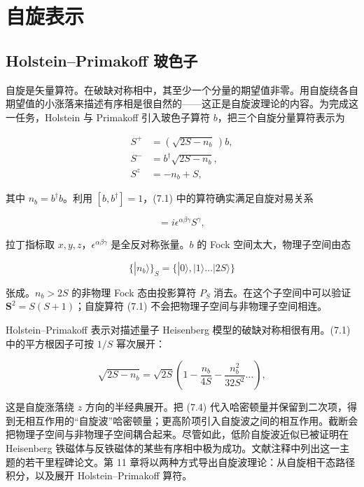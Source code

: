 \chapter{自旋表示}

\section{Holstein--Primakoff 玻色子}

自旋是矢量算符。在破缺对称相中，其至少一个分量的期望值非零。用自旋绕各自期望值的小涨落来描述有序相是很自然的——这正是自旋波理论的内容。为完成这一任务，Holstein 与 Primakoff 引入玻色子算符 $b$，把三个自旋分量算符表示为

\begin{align*}
S ^ {+} & = \left( \sqrt {2 S - n _ {b}} \, \right) b ,\\
S ^ {-} & = b ^ {\dagger} \sqrt {2 S - n _ {b}} ,\\
S ^ {z} & = - n _ {b} + S ,
\tag{7.1}
\end{align*}

其中 $n_{b} = b^{\dagger}b$。利用 $[b, b^{\dagger}] = 1$，(7.1) 中的算符确实满足自旋对易关系

\begin{equation*}
[ S ^ {\alpha}, S ^ {\beta} ] = i \epsilon^ {\alpha \beta \gamma} S ^ {\gamma} ,
\tag{7.2}
\end{equation*}

拉丁指标取 $x, y, z$，$\epsilon^{\alpha\beta\gamma}$ 是全反对称张量。$b$ 的 Fock 空间太大，物理子空间由态

\begin{equation*}
\{ | n _ {b} \rangle \} _ {S} = \{ | 0 \rangle , | 1 \rangle \dots | 2 S \rangle \}
\tag{7.3}
\end{equation*}

张成。$n_{b} > 2S$ 的非物理 Fock 态由投影算符 $P_{S}$ 消去。在这个子空间中可以验证 $\mathbf{S}^{2} = S(S + 1)$；自旋算符 (7.1) 不会把物理子空间与非物理子空间相连。

Holstein--Primakoff 表示对描述量子 Heisenberg 模型的破缺对称相很有用。(7.1) 中的平方根因子可按 $1/S$ 幂次展开：

\begin{equation*}
\sqrt {2 S - n _ {b}} = \sqrt {2 S} \left( 1 - \frac {n _ {b}}{4 S} - \frac {n _ {b} ^ {2}}{32 S ^ {2}} \dots \right) ,
\tag{7.4}
\end{equation*}

这是自旋涨落绕 $z$ 方向的半经典展开。把 (7.4) 代入哈密顿量并保留到二次项，得到无相互作用的“自旋波”哈密顿量；更高阶项引入自旋波之间的相互作用。截断会把物理子空间与非物理子空间耦合起来。尽管如此，低阶自旋波近似已被证明在 Heisenberg 铁磁体与反铁磁体的某些有序相中极为成功。文献注释中列出这一主题的若干里程碑论文。第 11 章将以两种方式导出自旋波理论：从自旋相干态路径积分，以及展开 Holstein--Primakoff 算符。

